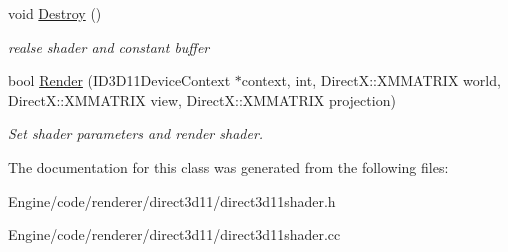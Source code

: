 \begin{DoxyCompactItemize}
void \mbox{\hyperlink{class_direct3_d11_1_1_direct3_d11_shader_afaa2962ffbeff81b22f70b1386fe7426}{Destroy}} ()
\begin{DoxyCompactList}\small\item\em realse shader and constant buffer \end{DoxyCompactList}\item 
\mbox{\label{class_direct3_d11_1_1_direct3_d11_shader_a35162d4c3e967b34c9ff4868258d0148}} 
bool \mbox{\hyperlink{class_direct3_d11_1_1_direct3_d11_shader_a35162d4c3e967b34c9ff4868258d0148}{Render}} (I\+D3\+D11\+Device\+Context $\ast$context, int, Direct\+X\+::\+X\+M\+M\+A\+T\+R\+IX world, Direct\+X\+::\+X\+M\+M\+A\+T\+R\+IX view, Direct\+X\+::\+X\+M\+M\+A\+T\+R\+IX projection)
\begin{DoxyCompactList}\small\item\em Set shader parameters and render shader. \end{DoxyCompactList}\end{DoxyCompactItemize}


The documentation for this class was generated from the following files\+:\begin{DoxyCompactItemize}
\item 
Engine/code/renderer/direct3d11/direct3d11shader.\+h\item 
Engine/code/renderer/direct3d11/direct3d11shader.\+cc\end{DoxyCompactItemize}
